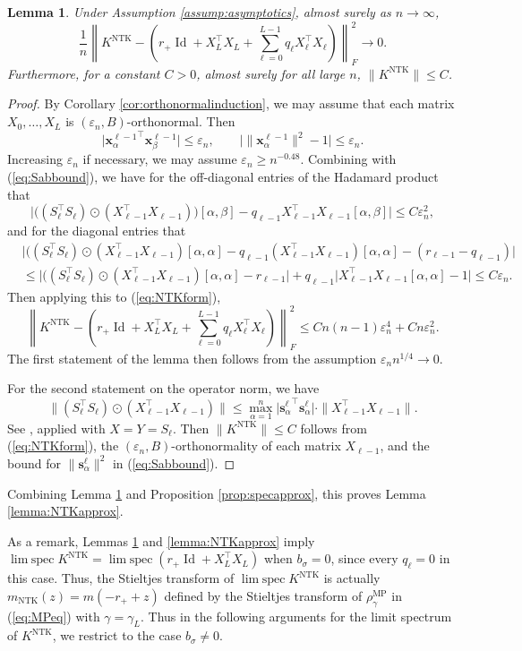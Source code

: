 \documentclass{article}
\newtheorem{lemma}[theorem]{Lemma}
\theoremstyle{definition}
\newcommand{\Id}{\operatorname{Id}}
\newcommand{\NTK}{\text{NTK}}
\newcommand{\MP}{\text{MP}}
\newcommand{\x}{\mathbf{x}}
\newcommand{\s}{\mathbf{s}}
\renewcommand{\a}{\alpha}
\renewcommand{\b}{\beta}
\newcommand{\eps}{\varepsilon}
\newcommand{\1}{\mathbf{1}}
\newcommand{\limspec}{\operatorname{lim\;spec}}
\begin{document}
\begin{lemma}\label{lemma:NTKFapprox}
Under Assumption \ref{assump:asymptotics}, almost surely as $n \to \infty$,
\[\frac{1}{n}
\left\|K^\NTK-\left(r_+\Id+X_L^\top X_L+\sum_{\ell=0}^{L-1} q_\ell X_\ell^\top
X_\ell\right)\right\|_F^2 \to 0.\]
Furthermore, for a constant $C>0$, almost surely for all large $n$, 
$\|K^\NTK\| \leq C$.
\end{lemma}
\begin{proof}
By Corollary \ref{cor:orthonormalinduction}, we may assume that each matrix
$X_0,\ldots,X_L$ is $(\eps_n,B)$-orthonormal. Then
\[\Big|{\x_\a^{\ell-1}}^\top\x_\b^{\ell-1}\Big| \leq \eps_n,
\qquad \Big|\|\x_\a^{\ell-1}\|^2-1\Big| \leq \eps_n.\]
Increasing $\eps_n$ if necessary, we may assume $\eps_n \geq n^{-0.48}$.
Combining with (\ref{eq:Sabbound}), we have for the off-diagonal entries of
the Hadamard product that
\[\Big|\big((S_\ell^\top S_\ell) \odot (X_{\ell-1}^\top X_{\ell-1})\big)
[\a,\b]-q_{\ell-1} X_{\ell-1}^\top X_{\ell-1}[\a,\b]\Big| \leq C\eps_n^2,\]
and for the diagonal entries that
\begin{align*}
&\Big|\big((S_\ell^\top S_\ell) \odot (X_{\ell-1}^\top
X_{\ell-1})[\a,\a]-q_{\ell-1}(X_{\ell-1}^\top X_{\ell-1})[\a,\a]
-(r_{\ell-1}-q_{\ell-1})\Big|\\
&\leq \Big|\big((S_\ell^\top S_\ell) \odot (X_{\ell-1}^\top
X_{\ell-1})[\a,\a]-r_{\ell-1}\Big|
+q_{\ell-1}\Big|X_{\ell-1}^\top X_{\ell-1}[\a,\a]-1\Big|
\leq C\eps_n.
\end{align*}
Then applying this to (\ref{eq:NTKform}),
\[\left\|K^\NTK-\left(r_+\Id+X_L^\top X_L+\sum_{\ell=0}^{L-1} q_\ell X_\ell^\top
X_\ell\right)\right\|_F^2 \leq Cn(n-1)\eps_n^4+Cn\eps_n^2.\]
The first statement of the lemma then follows
from the assumption $\eps_n n^{1/4} \to 0$.

For the second statement on the operator norm, we have
\[\|(S_\ell^\top S_\ell) \odot (X_{\ell-1}^\top X_{\ell-1})\|
\leq \max_{\a=1}^n \Big|{\s^\ell_\a}^\top \s^\ell_\a\Big|
\cdot \|X_{\ell-1}^\top X_{\ell-1}\|.\]
See \cite[Eq.\ (3.7.9)]{johnson1990matrix}, applied with $X=Y=S_\ell$.
Then $\|K^\NTK\| \leq C$ follows from (\ref{eq:NTKform}), the
$(\eps_n,B)$-orthonormality of each matrix
$X_{\ell-1}$, and the bound for $\|\s_\a^\ell\|^2$ in (\ref{eq:Sabbound}).
\end{proof}

Combining Lemma \ref{lemma:NTKFapprox} and Proposition
\ref{prop:specapprox}, this proves Lemma \ref{lemma:NTKapprox}.

As a remark, Lemmas \ref{lemma:NTKFapprox} and \ref{lemma:NTKapprox} imply
$\limspec K^\NTK=\limspec(r_+\Id+X_L^\top X_L)$ when $b_\sigma=0$, since every
$q_{\ell}=0$ in this case. Thus, the Stieltjes transform of $\limspec K^\NTK$ is
actually $m_\NTK(z)=m(-r_++z)$ defined by the Stieltjes transform of
$\rho^\MP_\gamma$ in (\ref{eq:MPeq}) with $\gamma=\gamma_L$. Thus in the
following arguments for the limit spectrum of $K^\NTK$, we restrict to the case
$b_\sigma\neq 0$.
\end{document}
